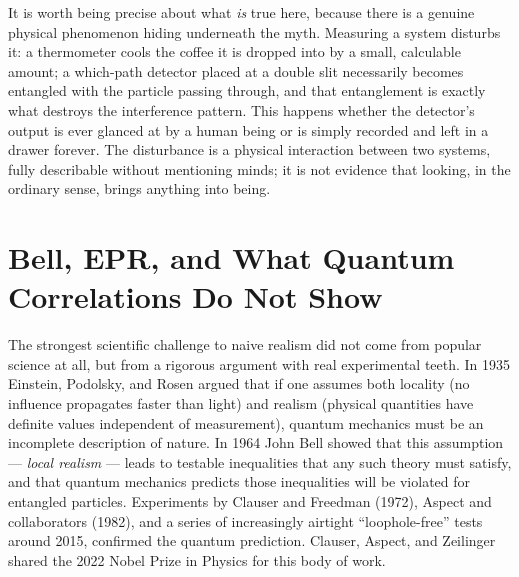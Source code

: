 It is worth being precise about what \emph{is} true here, because there is
a genuine physical phenomenon hiding underneath the myth. Measuring a
system disturbs it: a thermometer cools the coffee it is dropped into by a
small, calculable amount; a which-path detector placed at a double slit
necessarily becomes entangled with the particle passing through, and that
entanglement is exactly what destroys the interference pattern. This
happens whether the detector's output is ever glanced at by a human being
or is simply recorded and left in a drawer forever. The disturbance is a
physical interaction between two systems, fully describable without
mentioning minds; it is not evidence that looking, in the ordinary sense,
brings anything into being.

\section{Bell, EPR, and What Quantum Correlations Do Not Show}
\label{sec:bell}

The strongest scientific challenge to naive realism did not come from
popular science at all, but from a rigorous argument with real
experimental teeth. In 1935 Einstein, Podolsky, and Rosen argued that if
one assumes both locality (no influence propagates faster than light) and
realism (physical quantities have definite values independent of
measurement), quantum mechanics must be an incomplete description of
nature. In 1964 John Bell showed that this assumption --- \emph{local
realism} --- leads to testable inequalities that any such theory must
satisfy, and that quantum mechanics predicts those inequalities will be
violated for entangled particles. Experiments by Clauser and Freedman
(1972), Aspect and collaborators (1982), and a series of increasingly
airtight ``loophole-free'' tests around 2015, confirmed the quantum
prediction. Clauser, Aspect, and Zeilinger shared the 2022 Nobel Prize in
Physics for this body of work.


